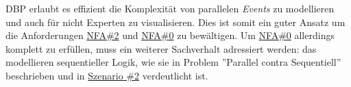 \ac{DBP} erlaubt es effizient die Komplexität von parallelen \textit{Events} zu modellieren und auch für nicht Experten zu visualisieren. Dies ist somit ein guter Ansatz um die Anforderungen \hyperref[tab:NFA2]{NFA\#2} und \hyperref[tab:NFA0]{NFA\#0} zu bewältigen. Um \hyperref[tab:NFA0]{NFA\#0} allerdings komplett zu erfüllen, muss ein weiterer Sachverhalt adressiert werden: das modellieren sequentieller Logik, wie sie in Problem ''Parallel contra Sequentiell'' beschrieben und in  \hyperref[szenario2]{Szenario \#2} verdeutlicht ist.